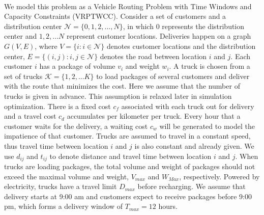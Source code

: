 \documentclass[12pt]{article}
\numberwithin{equation}{section}
\begin{document}
	\paragraph{}We model this problem as a Vehicle Routing Problem with Time Windows and Capacity Constraints (VRPTWCC)\parencite{Schneider2016}. Consider a set of customers and a distribution center $\mathcal{N}=\{0,1,2,..., N\}$, in which 0 represents the distribution center and $1,2,...N$ represent customer locations. Deliveries happen on a graph $G(V, E)$, where $V=\{i: i\in \mathcal{N}\}$ denotes customer locations and the distribution center, $E=\{(i,j):i,j\in \mathcal{N}\}$ denotes the road between location $i$ and $j$.  Each customer $i$ has a package of volume $v_i$ and weight $w_i$. A truck is chosen from a set of trucks $\mathcal{K}=\{1,2,...K\}$ to load packages of several customers and deliver with the route that minimizes the cost. Here we assume that the number of trucks is given in advance. This assumption is relaxed later in simulation optimization. There is a fixed cost $c_f$ associated with each truck out for delivery and a travel cost $c_d$ accumulates per kilometer per truck. Every hour that a customer waits for the delivery, a waiting cost $c_w$ will be generated to model the impatience of that customer. Trucks are assumed to travel in a constant speed, thus travel time between location $i$ and $j$ is also constant and already given. We use $d_{ij}$ and $t_{ij}$ to denote distance and travel time between location $i$ and $j$. When trucks are loading packages, the total volume and weight of packages should not exceed the maximal volume and weight, $V_{max}$ and $W_{Max}$, respectively. Powered by electricity, trucks have a travel limit $D_{max}$ before recharging. We assume that delivery starts at 9:00 am and customers expect to receive packages before 9:00 pm, which forms a delivery window of $T_{max}=12$ hours.
	
\end{document}
